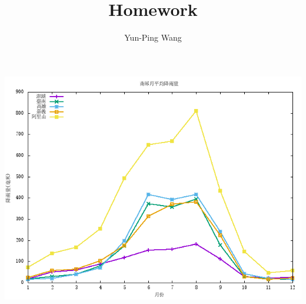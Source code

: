 \documentclass[11pt]{article}
\title{Homework}
\author{Yun-Ping Wang}
\begin{document}
\maketitle
\includegraphics[width=\linewidth]{./statistic.png}
\nocite{opac-b1082883}

\end{document}
